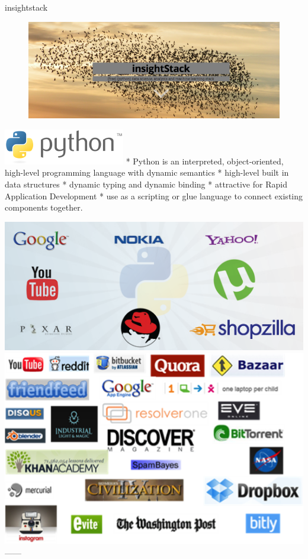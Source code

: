 \documentclass{article}
\begin{document}
insightstack

\begin{figure}[htbp]
\centering
\includegraphics{insightstack2.png}
\end{figure}

    \includegraphics{python.png} * Python is an interpreted,
object-oriented, high-level programming language with dynamic semantics
* high-level built in data structures * dynamic typing and dynamic
binding * attractive for Rapid Application Development * use as a
scripting or glue language to connect existing components together.

\textbar{} \includegraphics{python_companies.png} \textbar{}
\includegraphics{python_companies2.png}
\textbar{}\\\textbar{}---\textbar{}---\textbar{}
\end{document}
